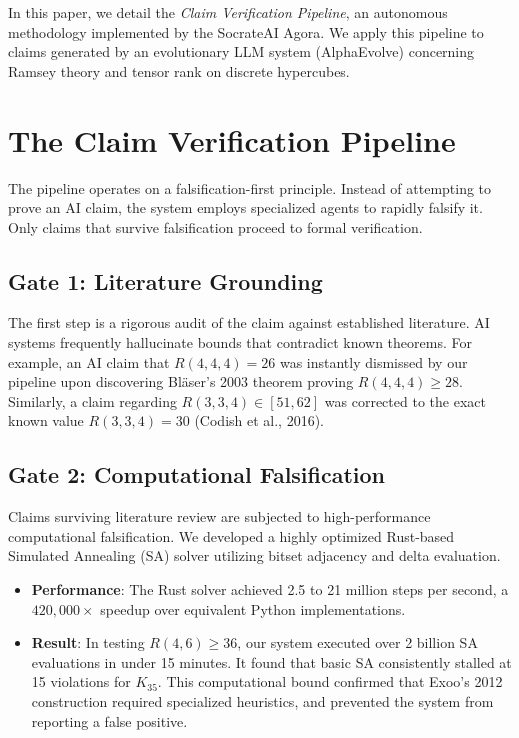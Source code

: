 \documentclass[11pt,a4paper]{article}
\begin{document}
In this paper, we detail the \textit{Claim Verification Pipeline}, an autonomous methodology implemented by the SocrateAI Agora. We apply this pipeline to claims generated by an evolutionary LLM system (AlphaEvolve) concerning Ramsey theory and tensor rank on discrete hypercubes.

\section{The Claim Verification Pipeline}

The pipeline operates on a falsification-first principle. Instead of attempting to prove an AI claim, the system employs specialized agents to rapidly falsify it. Only claims that survive falsification proceed to formal verification.

\subsection{Gate 1: Literature Grounding}
The first step is a rigorous audit of the claim against established literature. AI systems frequently hallucinate bounds that contradict known theorems. For example, an AI claim that $R(4,4,4) = 26$ was instantly dismissed by our pipeline upon discovering Bl\"{a}ser's 2003 theorem proving $R(4,4,4) \ge 28$. Similarly, a claim regarding $R(3,3,4) \in [51, 62]$ was corrected to the exact known value $R(3,3,4) = 30$ (Codish et al., 2016).

\subsection{Gate 2: Computational Falsification}
Claims surviving literature review are subjected to high-performance computational falsification. We developed a highly optimized Rust-based Simulated Annealing (SA) solver utilizing bitset adjacency and delta evaluation. 
\begin{itemize}
    \item \textbf{Performance}: The Rust solver achieved 2.5 to 21 million steps per second, a $420,000\times$ speedup over equivalent Python implementations.
    \item \textbf{Result}: In testing $R(4,6) \ge 36$, our system executed over 2 billion SA evaluations in under 15 minutes. It found that basic SA consistently stalled at 15 violations for $K_{35}$. This computational bound confirmed that Exoo's 2012 construction required specialized heuristics, and prevented the system from reporting a false positive.
\end{itemize}
\end{document}
